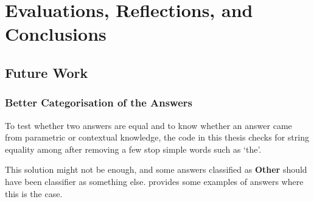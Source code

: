 \section{Evaluations, Reflections, and Conclusions}

\subsection{Future Work}

\subsubsection{Better Categorisation of the Answers}

To test whether two answers are equal and to know whether an answer came from parametric or contextual knowledge, the code in this thesis checks for string equality among after removing a few stop simple words such as `the'.

This solution might not be enough, and some answers classified as \textbf{Other} should have been classifier as something else.
 provides some examples of answers where this is the case.

